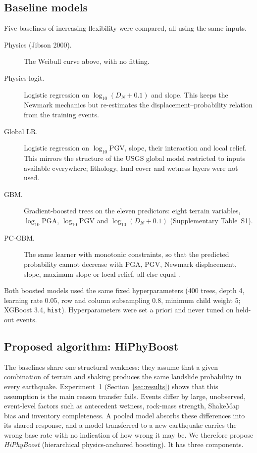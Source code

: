\subsection{Baseline models}
Five baselines of increasing flexibility were compared, all using the same inputs.
\begin{description}
\item[Physics (Jibson 2000).] The Weibull curve above, with no fitting.
\item[Physics-logit.] Logistic regression on $\log_{10}(D_N+0.1)$ and slope. This keeps the Newmark mechanics but re-estimates the displacement--probability relation from the training events.
\item[Global LR.] Logistic regression on $\log_{10}$PGV, slope, their interaction and local relief. This mirrors the structure of the USGS global model \citep{nowickijessee2018} restricted to inputs available everywhere; lithology, land cover and wetness layers were not used.
\item[GBM.] Gradient-boosted trees \citep{friedman2001,chen2016} on the eleven predictors: eight terrain variables, $\log_{10}$PGA, $\log_{10}$PGV and $\log_{10}(D_N+0.1)$ (Supplementary Table~S1).
\item[PC-GBM.] The same learner with monotonic constraints, so that the predicted probability cannot decrease with PGA, PGV, Newmark displacement, slope, maximum slope or local relief, all else equal \citep{karpatne2017}.
\end{description}
Both boosted models used the same fixed hyperparameters (400 trees, depth 4, learning rate 0.05, row and column subsampling 0.8, minimum child weight 5; XGBoost 3.4, \texttt{hist}). Hyperparameters were set a priori and never tuned on held-out events.

\subsection{Proposed algorithm: HiPhyBoost}\label{sec:hiphy}
The baselines share one structural weakness: they assume that a given combination of terrain and shaking produces the same landslide probability in every earthquake. Experiment~1 (Section~\ref{sec:results}) shows that this assumption is the main reason transfer fails. Events differ by large, unobserved, event-level factors such as antecedent wetness, rock-mass strength, ShakeMap bias and inventory completeness. A pooled model absorbs these differences into its shared response, and a model transferred to a new earthquake carries the wrong base rate with no indication of how wrong it may be. We therefore propose \emph{HiPhyBoost} (hierarchical physics-anchored boosting). It has three components.

